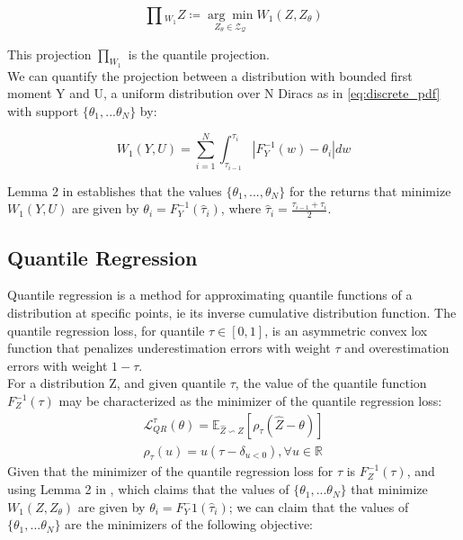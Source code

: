 \begin{equation}
    \prod{}_{W_1} Z \coloneqq  \underset{Z_\theta \in \mathcal{Z_Q}}{\arg \min } W_1(Z,Z_\theta)
\end{equation}

This projection $\prod_ {W_1}$ is the quantile projection.\\
We can quantify the projection between a distribution with bounded first moment Y and U, a uniform distribution
over N Diracs as in \eqref{eq:discrete_pdf} with support $\{\theta_1, ... \theta_N\}$ by:

\begin{equation}
    W_1(Y,U)= \sum_{i=1}^{N}\int_{\tau_{i-1}}^{\tau_i} |   F_Y^{-1}(w)-\theta_i   |dw
\end{equation}

Lemma 2 in \cite{Dabney2018} establishes that the values $\{\theta_1, ... ,\theta_N\}$ for the returns  that minimize 
$W_1(Y,U)$ are given by $\theta_i = F_Y^{-1}(\hat\tau_i)$, where $\hat\tau_i=\frac{\tau_{i-1}+\tau_i}{2}$.

\subsection{Quantile Regression}
Quantile regression is a method for approximating quantile functions of a distribution at specific points, ie its inverse
cumulative distribution function.
The quantile regression loss, for quantile $\tau \in [0,1]$, is an asymmetric convex lox function
that penalizes underestimation errors with weight $\tau$ and overestimation errors
with weight $1-\tau$. \\
For a distribution Z, and given quantile $\tau$, the value of the quantile function $F_Z^{-1}(\tau)$
may be characterized as the minimizer of the quantile regression loss:
\begin{align}
    \mathcal{L}_{QR}^{\tau}(\theta)=\mathbb E_{\hat{Z}\backsim Z}[\rho_\tau(\hat{Z}-\theta) ] \label{eq:quantile_loss}\\
    \rho_\tau(u)=u(\tau - \delta_{u<0}) , \forall u \in \mathbb{R} \nonumber
\end{align}
Given that the minimizer of the quantile regression loss for $\tau$ is $F_Z^{-1}(\tau)$, and using Lemma 2 in \cite{Dabney2018},
which claims that the values of $\{\theta_1, ... \theta_N\}$ that minimize
 $W_1(Z,Z_\theta)$ are given by $\theta_i = F_Y^-1(\hat\tau_i)$; we can claim that
 the values of $\{\theta_1, ... \theta_N\}$ are the minimizers of the following objective:

